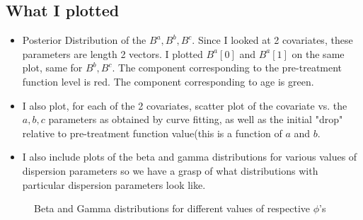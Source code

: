 \subsection{What I plotted}
\begin{itemize}
\item Posterior Distribution of the $B^a,B^b,B^c$.  Since I looked at 2 covariates, these parameters are length 2 vectors.  I plotted $B^a[0]$ and $B^a[1]$ on the same plot, same for $B^b,B^c$.  The component corresponding to the pre-treatment function level is red.  The component corresponding to age is green.
\item I also plot, for each of the 2 covariates, scatter plot of the covariate vs. the $a,b,c$ parameters as obtained by curve fitting, as well as the initial "drop" relative to pre-treatment function value(this is a function of $a$ and $b$.
\item I also include plots of the beta and gamma distributions for various values of dispersion parameters so we have a grasp of what distributions with particular dispersion parameters look like.
\end{itemize}

\begin{figure}
\begin{subfigure}{
\texttt{[image: /Users/glareprotector/Documents/lab/glare/tex\_files/sections/analyze\_bias/files/beta\_phi.png]}}
\end{subfigure}
\begin{subfigure}{
\texttt{[image: /Users/glareprotector/Documents/lab/glare/tex\_files/sections/gamma\_distribution/files/gamma\_dist.png]}}
\end{subfigure}
\caption{Beta and Gamma distributions for different values of respective $\phi$'s}
\end{figure}


